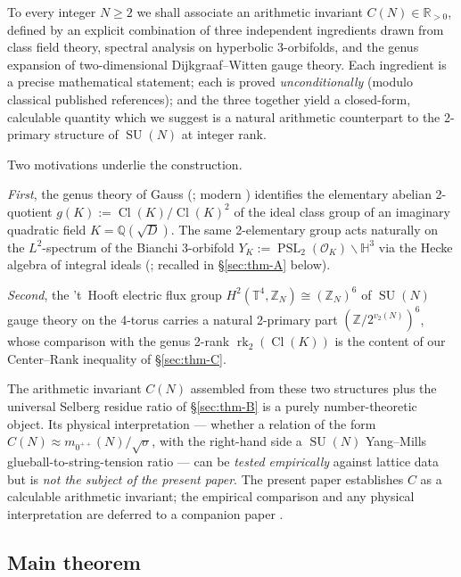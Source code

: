 \documentclass[11pt,a4paper,reqno]{amsart}
\theoremstyle{definition}
\DeclareMathOperator{\PSL}{PSL}
\DeclareMathOperator{\SU}{SU}
\DeclareMathOperator{\Cl}{Cl}
\DeclareMathOperator{\rk}{rk}
\newcommand{\OK}{\mathcal{O}_K}
\newcommand{\HH}{\mathbb{H}}
\newcommand{\RR}{\mathbb{R}}
\newcommand{\QQ}{\mathbb{Q}}
\newcommand{\ZZ}{\mathbb{Z}}
\newcommand{\TT}{\mathbb{T}}
\newcommand{\YK}{Y_K}
\newcommand{\gK}{g(K)}
\newcommand{\vtwo}{v_2}
\newcommand{\Cinv}{C}
\begin{document}
To every integer $N\ge 2$ we shall associate an arithmetic invariant
$\Cinv(N)\in\RR_{>0}$, defined by an explicit combination of three independent
ingredients drawn from class field theory, spectral analysis on
hyperbolic 3-orbifolds, and the genus expansion of two-dimensional
Dijkgraaf--Witten gauge theory.  Each ingredient is a precise mathematical
statement; each is proved \emph{unconditionally} (modulo classical
published references); and the three together yield a closed-form, calculable
quantity which we suggest is a natural arithmetic counterpart to the
2-primary structure of $\SU(N)$ at integer rank.

Two motivations underlie the construction.

\emph{First}, the genus theory of Gauss (\cite{Gauss1801}; modern
\cite[Thm.~7.7]{Cox1989}) identifies the elementary abelian 2-quotient
$\gK := \Cl(K)/\Cl(K)^{2}$ of the ideal class group of an imaginary quadratic
field $K=\QQ(\sqrt{D})$.  The same 2-elementary group acts naturally on the
$L^{2}$-spectrum of the Bianchi 3-orbifold $\YK := \PSL_{2}(\OK)\backslash
\HH^{3}$ via the Hecke algebra of integral ideals
(\cite[\S7.6]{ElstrodtGrunewaldMennicke1998}; recalled in \S\ref{sec:thm-A}
below).

\emph{Second}, the 't~Hooft electric flux group
$H^{2}(\TT^{4},\ZZ_{N})\cong(\ZZ_{N})^{6}$ \cite{tHooft1979} of $\SU(N)$
gauge theory on the 4-torus carries a natural 2-primary part
$(\ZZ/2^{\vtwo(N)})^{6}$, whose comparison with the genus 2-rank
$\rk_{2}(\Cl(K))$ is the content of our Center--Rank inequality of
\S\ref{sec:thm-C}.

The arithmetic invariant $\Cinv(N)$ assembled from these two structures plus
the universal Selberg residue ratio of \S\ref{sec:thm-B} is a purely
number-theoretic object.  Its physical interpretation --- whether a relation of
the form $\Cinv(N) \approx m_{0^{++}}(N)/\sqrt{\sigma}$, with the right-hand
side a $\SU(N)$ Yang--Mills glueball-to-string-tension ratio --- can be
\emph{tested empirically} against lattice data \cite{Athenodorou2021} but is
\emph{not the subject of the present paper}.  The present paper establishes
$\Cinv$ as a calculable arithmetic invariant; the empirical comparison and any
physical interpretation are deferred to a companion paper
\cite{Remondiere2026Transport}.

\subsection{Main theorem}\label{ss:mainthm}
\end{document}
